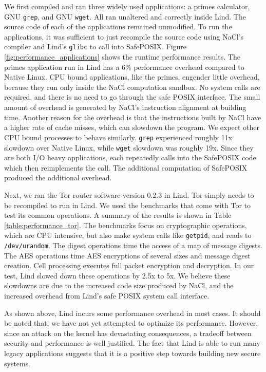{{We first compiled and ran three widely used applications:
a primes calculator, GNU \texttt{grep}, and GNU \texttt{wget}. All ran unaltered and
correctly inside Lind. The source code of each of the applications remained
unmodified. To run the applications, it was sufficient to just recompile the
source code using NaCl's compiler and Lind's \texttt{glibc} to call
into SafePOSIX.
Figure \ref{fig:performance_applications} shows the runtime performance
results.
The primes application run in Lind has a 6\% performance overhead compared to
Native Linux. CPU bound applications, like the primes, engender little overhead,
because they run only inside the NaCl computation sandbox. No system calls are required,
and there is no need to go through the safe POSIX interface. The small amount of overhead
is generated by NaCl's instruction alignment at building time. Another reason for the overhead
is that the instructions built by NaCl have a higher rate of cache misses, which can slowdown the
program.
We expect other CPU bound processes to behave similarly.
\texttt{grep} experienced roughly 11x slowdown over Native Linux, while \texttt{wget}
slowdown was roughly 19x. Since they are both I/O heavy applications,
each repeatedly calls into the SafePOSIX code which then reimplements
the call.  The additional computation of SafePOSIX produced the additional
overhead.

Next, we ran the Tor router software version 0.2.3 in Lind. Tor simply
needs to be recompiled to run in Lind.
We used the benchmarks that come with Tor to test its common operations.
A summary of the results is shown in Table \ref{table:performance_tor}. The
benchmarks focus on cryptographic operations,
which are CPU intensive, but also make system calls like \texttt{getpid}, and reads to
\texttt{/dev/urandom}.
The digest operations time the access of a map of message digests.
The AES operations time AES encryptions of several sizes and message
digest creation.
Cell processing executes full packet encryption and decryption. In our
test, Lind slowed down these operations by 2.5x to 5x. We believe these
slowdowns are due to the increased code size produced by NaCl,
and the
increased overhead from Lind's safe POSIX system call interface.

As shown above,  Lind incurs some performance overhead in most cases.
It should be noted that, we have not  yet attempted to optimize its performance.
However, since an attack on the kernel has devastating
consequences, %
a tradeoff between security and performance is well justified.
The fact that Lind is able to run many 
legacy applications
suggests that it
is a positive step towards building new secure systems.

}}

